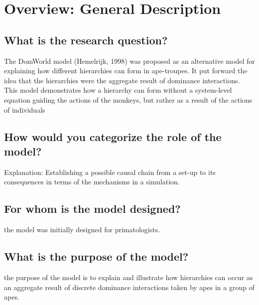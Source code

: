 \documentclass{article}
\begin{document}
\newlength\myindent
\setlength\myindent{2em}
\newcommand\bindent{%
  \begingroup
  \setlength{\itemindent}{\myindent}
  \addtolength{\algorithmicindent}{\myindent}
}
\newcommand\eindent{\endgroup}


\section{Overview: General Description}
\subsection{What is the research question?}
The DomWorld model (Hemelrijk, 1998) was proposed as an alternative model for explaining how different hierarchies can form in ape-troupes. It put forward the idea that the hierarchies were the aggregate result of dominance interactions. This model demonstrates how a hierarchy can form without a system-level equation guiding the actions of the monkeys, but rather as a result of the actions of individuals
\subsection{How would you categorize the role of the model?}
Explanation: Establishing a possible causal chain from a set-up to its consequences in terms of the mechanisms in a simulation.
\subsection{For whom is the model designed?}
the model was initially designed for primatologists. 
\subsection{What is the purpose of the model?}
the purpose of the model is to explain and illustrate how hierarchies can occur as an aggregate result of discrete dominance interactions taken by apes in a group of apes.
\end{document}
